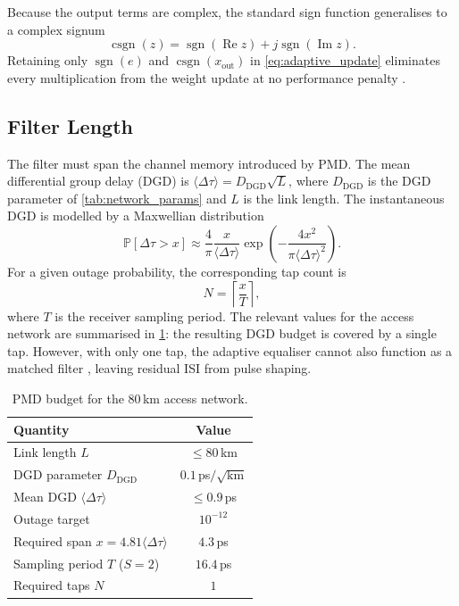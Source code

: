 \documentclass[12pt,a4paper]{article}
\begin{document}
Because the output terms are complex, the standard sign function generalises to a complex signum
\begin{equation}
    \operatorname{csgn}(z) = \operatorname{sgn}(\operatorname{Re} z) + j\operatorname{sgn}(\operatorname{Im} z).
\end{equation}
Retaining only $\operatorname{sgn}(e)$ and $\operatorname{csgn}(x_\mathrm{out})$ in \cref{eq:adaptive_update} eliminates every multiplication from the weight update at no performance penalty \cite{Cardenas:14}.

\subsection{Filter Length}
The filter must span the channel memory introduced by PMD. The mean differential group delay (DGD) is \(\langle\Delta \tau\rangle = D_\mathrm{DGD}\sqrt{L}\), where \(D_\mathrm{DGD}\) is the DGD parameter of \cref{tab:network_params} and \(L\) is the link length. The instantaneous DGD is modelled by a Maxwellian distribution \cite{Mantzoukis:11}
\begin{equation}
    \mathbb{P}[\Delta \tau > x] \approx \frac{4}{\pi}\frac{x}{\langle\Delta \tau \rangle}\exp\left(-\frac{4x^2}{\pi {\langle\Delta\tau\rangle}^2}\right).
    \label{eq:maxwellian}
\end{equation}
For a given outage probability, the corresponding tap count is
\begin{equation}
    N = \left\lceil\frac{x}{T}\right\rceil,
    \label{eq:aeq_taps}
\end{equation}
where $T$ is the receiver sampling period. The relevant values for the access network are summarised in \cref{tab:pmd_budget}: the resulting DGD budget is covered by a single tap. However, with only one tap, the adaptive equaliser cannot also function as a matched filter \cite{Ezra;07}, leaving residual ISI from pulse shaping.
\begin{table}[H]
    \centering
    \begin{tabular}{lc}
        \toprule
        Quantity & Value \\
        \midrule
        Link length $L$                            & $\leq 80$\,km \\
        DGD parameter $D_\mathrm{DGD}$             & $0.1$\,ps$/\sqrt{\mathrm{km}}$ \\
        Mean DGD $\langle\Delta\tau\rangle$        & $\leq 0.9$\,ps \\
        Outage target                              & $10^{-12}$ \\
        Required span $x = 4.81\langle\Delta\tau\rangle$ & $4.3$\,ps \\
        Sampling period $T$ ($S=2$)                & $16.4$\,ps \\
        Required taps $N$                          & $1$ \\
        \bottomrule
    \end{tabular}
    \caption{PMD budget for the 80\,km access network.}
    \label{tab:pmd_budget}
\end{table}
\end{document}
